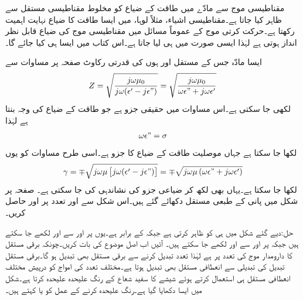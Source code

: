 مقناطیسی موج سے مادّے میں طاقت کے ضیاع کو مخلوط مقناطیسی مستقل  سے ظاہر کیا جاتا ہے۔مقناطیسی اشیاء، مثلاً لوہا، میں ایسا طاقت کا ضیاع نہایت اہمیت رکھتا ہے۔حرکت کرتی موج کے عموماً مسائل میں مقناطیسی موج کی ضیاع قابل نظر انداز ہوتی ہے لہٰذا ایسی صورت میں  ہی لیا جاتا ہے۔اس کتاب میں ایسا ہی کیا جائے گا۔

ایسا مادّہ جس کے مستقل  اور  ہوں کی قدرتی رکاوٹ صفحہ  پر مساوات  سے
\begin{align}
Z=\sqrt{\frac{j \omega \mu_0}{j \omega (\epsilon'-j\epsilon")}}=\sqrt{\frac{j\omega \mu_0}{\omega \epsilon"+j\omega \epsilon'}}
\end{align}
لکھی جا سکتی ہے۔اس مساوات میں حقیقی جزو  ہے جو طاقت کے ضیاع کی وجہ بنتا ہے لہٰذا 
\begin{align}
\omega \epsilon"=\sigma
\end{align}
لکھا جا سکتا ہے جہاں موصلیت طاقت کے ضیاع کا جزو ہے۔اسی طرح مساوات  کو یوں
\begin{align}
\gamma=\mp \sqrt{j \omega \mu  \left[j \omega (\epsilon'-j\epsilon" )\right]}=\mp \sqrt{j \omega \mu  \left(\omega \epsilon"+j\omega\epsilon' \right)}
\end{align}
لکھا جا سکتا ہے۔یہاں بھی  لکھ کر ضیاعی جزو کی نشاندہی کی جا سکتی ہے۔
صفحہ  پر شکل  میں پانی کے طبعی مستقل دکھائے گئے ہیں۔اس شکل سے  اور  تعدد پر  اور  حاصل کریں۔

حل:دیے گئے شکل میں  ہی  کو ظاہر کرتی ہے جبکہ  کے برابر ہے۔یوں   پر  اور  سے  اور 
لکھے جا سکتے ہیں جبکہ  پر  اور  سے  اور  لکھے جا سکتے ہیں۔
آئیں اب اصل موضوع کی بات کریں۔چونکہ برقی مستقل کا دارومدار موج کی تعدد پر ہے لہٰذا تعدد تبدیل  کرنے سے برقی مستقل بھی تبدیل ہو گا۔برقی مستقل تبدیل کی تبدیلی سے انعطافی مستقل بھی تبدیل ہوتا ہے۔مختلف تعدد کی امواج کو درپیش مختلف انعطافی مستقل ہی استعمال کرتے ہوئے شیشے کا   سفید شعاع کے رنگ علیحدہ علیحدہ کرتا ہے۔شکل  میں ایسا دکھایا گیا ہے۔رنگ علیحدہ کرنے کے عمل کو  یا  کہتے ہیں۔

